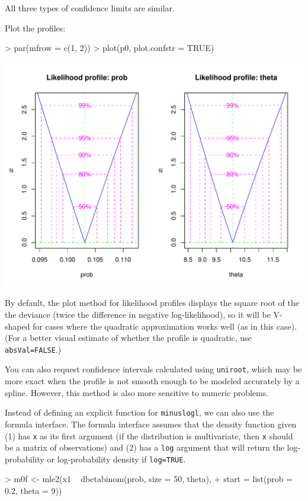 \documentclass{article}
\newcommand{\code}[1]{{\tt #1}}
\begin{document}
All three types of confidence limits are similar.

Plot the profiles:
\begin{Schunk}
\begin{Sinput}
> par(mfrow = c(1, 2))
> plot(p0, plot.confstr = TRUE)
\end{Sinput}
\end{Schunk}
\includegraphics{mle2-010}

By default, the plot method for 
likelihood profiles displays the square root of the
the deviance
(twice the difference in negative
log-likelihood), so it will
be {\sf V}-shaped
for cases where the quadratic approximation works well
(as in this case).
(For a better visual estimate of whether the profile
is quadratic, use \code{absVal=FALSE}.)

You can also request confidence intervals
calculated using \code{uniroot}, which may be more exact when
the profile is not smooth enough to be modeled accurately
by a spline.  However, this method is
also more sensitive to numeric problems.

Instead of defining an
explicit function for \code{minuslogl}, 
we can also use the formula interface.
The formula interface assumes that
the density function given (1) has \code{x} as
its first argument (if the distribution is multivariate,
then \code{x} should be a matrix of observations)
and (2) has a \code{log} argument that will return
the log-probability or log-probability density
if \code{log=TRUE}.
\begin{Schunk}
\begin{Sinput}
> m0f <- mle2(x1 ~ dbetabinom(prob, size = 50, theta), 
+     start = list(prob = 0.2, theta = 9))
\end{Sinput}
\end{Schunk}
\end{document}
